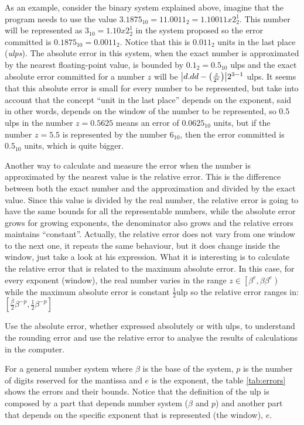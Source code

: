 As an example, consider the binary system explained above, imagine that the program needs to use the value $3.1875_{10} = 11.0011_2 = 1.10011x2^1_2$. This number will be represented as $3_{10} = 1.10x2^1_2$ in the system proposed so the error committed is $0.1875_{10} = 0.0011_2$. Notice that this is $0.011_2$ units in the last place (\textit{ulps}). The absolute error in this system, when the exact number is approximated by the nearest floating-point value, is bounded by $0.1_2 = 0.5_{10}$ ulps and the exact absolute error committed for a number $z$ will be $\abs{d.dd-\left(\frac{z}{2^e}\right)} 2^{3-1}$ ulps. It seems that this absolute error is small for every number to be represented, but take into account that the concept ``unit in the last place'' depends on the exponent, said in other words, depends on the window of the number to be represented, so $0.5$ ulps in the number $z = 0.5625$ means an error of $0.0625_{10}$ units, but if the number $z = 5.5$ is represented by the number $6_{10}$, then the error committed is $0.5_{10}$ units, which is quite bigger. 

Another way to calculate and measure the error when the number is approximated by the nearest value is the relative error. This is the difference between both the exact number and the approximation and divided by the exact value. Since this value is divided by the real number, the relative error is going to have the same bounds for all the representable numbers, while the absolute error grows for growing exponents, the denominator also grows and the relative errors maintains ``constant''. Actually, the relative error does not vary from one window to the next one, it repeats the same behaviour, but it does change inside the window, just take a look at his expression. What it is interesting is to calculate the relative error that is related to the maximum absolute error. In this case, for every exponent (window), the real number varies in the range $z \in \left[\beta^e, \beta \beta^e\right)$ while the maximum absolute error is constant $\frac{1}{2}\textrm{ulp}$ so the relative error ranges in: $\left[\frac{\beta}{2}\beta^{-p}, \frac{1}{2}\beta^{-p} \right]$

\begin{IN}
    Use the absolute error, whether expressed absolutely or with ulps, to understand the rounding error and use the relative error to analyse the results of calculations in the computer.
\end{IN}  

For a general number system where $\beta$ is the base of the system, $p$ is the number of digits reserved for the mantissa and $e$ is the exponent, the table \ref{tab:errors} shows the errors and their bounds. Notice that the definition of the ulp is composed by a part that depends number system ($\beta$ and $p$) and another part that depends on the specific exponent that is represented (the window), $e$. 

